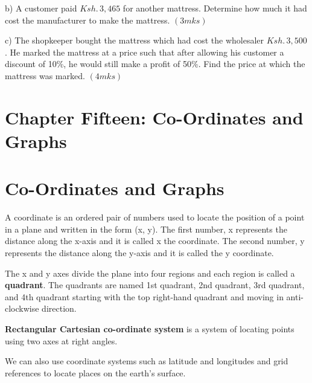 \documentclass[
  a4paperpaper,
]{scrbook}
\begin{document}
\begin{tcolorbox}
\begin{enumerate}
  b) A customer paid \(Ksh.\, 3,465\) for another mattress. Determine
  how much it had cost the manufacturer to make the mattress.
  \hspace{8.2cm} \((3mks)\)

  c) The shopkeeper bought the mattress which had cost the wholesaler
  \(Ksh.\, 3,500\). He marked the mattress at a price such that after
  allowing his customer a discount of 10\%, he would still make a profit
  of 50\%. Find the price at which the mattress was marked.\hspace{1cm}
  \((4mks)\)
\end{enumerate}

\end{tcolorbox}


\chapter{Chapter Fifteen: Co-Ordinates and
Graphs}\label{chapter-fifteen-co-ordinates-and-graphs}


\chapter*{Co-Ordinates and Graphs}\label{co-ordinates-and-graphs}


A coordinate is an ordered pair of numbers used to locate the position
of a point in a plane and written in the form (x, y). The first number,
x represents the distance along the x-axis and it is called x the
coordinate. The second number, y represents the distance along the
y-axis and it is called the y coordinate.

The x and y axes divide the plane into four regions and each region is
called a \textbf{quadrant}. The quadrants are named 1st quadrant, 2nd
quadrant, 3rd quadrant, and 4th quadrant starting with the top
right-hand quadrant and moving in anti-clockwise direction.

\textbf{Rectangular Cartesian co-ordinate system} is a system of
locating points using two axes at right angles.

We can also use coordinate systems such as latitude and longitudes and
grid references to locate places on the earth's surface.
\end{document}
